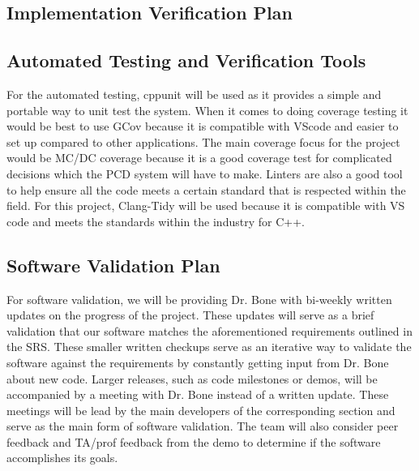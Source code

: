 \documentclass[12pt, titlepage]{article}
\begin{document}
\subsection{Implementation Verification Plan}




\subsection{Automated Testing and Verification Tools}

For the automated testing, cppunit will be used as it provides a simple and portable way to unit test the system. When it comes to doing coverage testing it would be best to use GCov because it is compatible with VScode and easier to set up compared to other applications. The main coverage focus for the project would be MC/DC coverage because it is a good coverage test for complicated decisions which the PCD system will have to make.
Linters are also a good tool to help ensure all the code meets a certain standard that is respected within the field. For this project, Clang-Tidy will be used because it is compatible with VS code and meets the standards within the industry for C++.


\subsection{Software Validation Plan}

For software validation, we will be providing Dr. Bone with bi-weekly written updates on the progress of the project. These updates
will serve as a brief validation that our software matches the aforementioned requirements outlined in the SRS. These smaller written checkups serve
as an iterative way to validate the software against the requirements by constantly getting input from Dr. Bone about new code.
Larger releases, such as code milestones or demos, will be accompanied by a meeting with Dr. Bone instead of a written update. 
These meetings will be lead by the main developers of the corresponding section and serve as the main form of software validation. 
The team will also consider peer feedback and TA/prof feedback from the demo to determine if the software accomplishes its goals.
\end{document}
